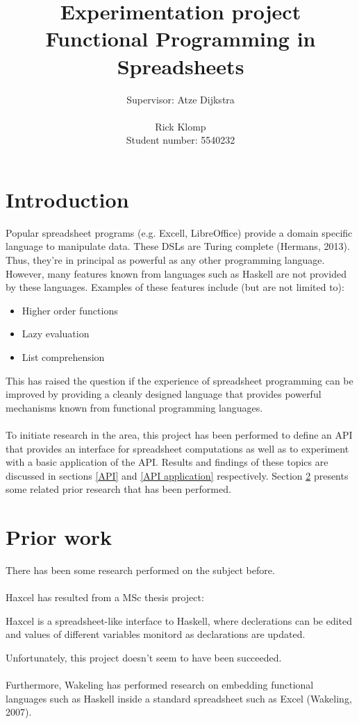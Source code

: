 \documentclass[10pt,a4paper]{article}
\begin{document}
\author{Supervisor: Atze Dijkstra\\\\Rick Klomp\\Student number: 5540232}
\title{Experimentation project\\Functional Programming in Spreadsheets}
\maketitle
\pagebreak

\section{Introduction}
Popular spreadsheet programs (e.g. Excell, LibreOffice) provide a
domain specific language to manipulate data. These DSLs are Turing complete (Hermans, 2013). Thus,
they're in principal as powerful as any other programming language.
However, many features known from languages such as Haskell are not provided by these languages.
Examples of these features include (but are not limited to):
\begin{itemize}
\item Higher order functions
\item Lazy evaluation
\item List comprehension
\end{itemize}
This has raised the question if the experience of spreadsheet programming can be improved by
providing a cleanly designed language that provides powerful mechanisms known from functional
programming languages.
\\\\
To initiate research in the area, this project has been performed to define an API that provides
an interface for spreadsheet computations as well as to experiment with a basic application of
the API. Results and findings of these topics are discussed in sections \ref{API} and
\ref{API application} respectively. Section \ref{Prior work} presents some related prior research
that has been performed.

\section{Prior work}
\label{Prior work}
There has been some research performed on the subject before.
\\\\
Haxcel has resulted from a MSc thesis project:
\begin{displayquote}[Lisper, 2005]
Haxcel is a spreadsheet-like interface to Haskell, where declerations can be edited and values of
different variables monitord as declarations are updated.
\end{displayquote}
Unfortunately, this project doesn't seem to have been succeeded.
\\\\
Furthermore, Wakeling has performed research on embedding functional languages such as Haskell
inside a standard spreadsheet such as Excel (Wakeling, 2007).
\end{document}
